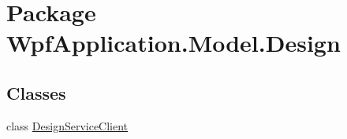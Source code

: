 \hypertarget{namespace_wpf_application_1_1_model_1_1_design}{\section{Package Wpf\-Application.\-Model.\-Design}
\label{namespace_wpf_application_1_1_model_1_1_design}
}
\subsection*{Classes}
\begin{DoxyCompactItemize}
\item 
class \hyperlink{class_wpf_application_1_1_model_1_1_design_1_1_design_service_client}{Design\-Service\-Client}
\end{DoxyCompactItemize}
